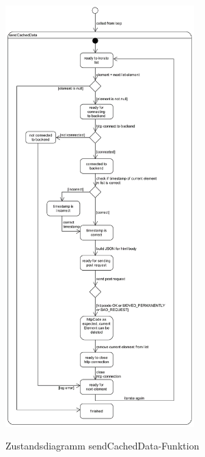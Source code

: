 \begin{figure}[H]
    \centering
    \begin{minipage}[t]{1\textwidth}
        \caption{Zustandsdiagramm sendCachedData-Funktion}
        \includegraphics[width=0.65\textwidth]{img/zustandsdiagramm_nodemcu_sendCachedData.png}\\
        \label{fig:zust_diag_nodemcu_send}
    \end{minipage}
\end{figure}